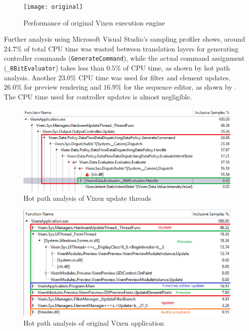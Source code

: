 \begin{figure}[t]
  \centering
  \texttt{[image: original]}
  \caption{Performance of original Vixen execution engine}
  \label{fig:original}
\end{figure}

Further analysis using Microsoft Visual Studio's sampling profiler shows, around $24.7 \%$ of total CPU time was wasted between translation layers for generating controller commands (\texttt{GenerateCommand}), while the actual command assignment (\texttt{\_8BitEvaluator}) takes less than $0.5 \%$ of CPU time, as shown by  hot path analysis. Another $23.0 \%$ CPU time was used for filter and element updates, $26.0 \%$ for preview rendering and $16.9 \%$ for the sequence editor, as shown by . The CPU time used for controller updates is almost negligible.

\begin{figure}[t]
  \centering
  \includegraphics[width=0.85\columnwidth]{Figs/vixen_perf_original.png}
  \caption{Hot path analysis of Vixen update threads}
  \label{fig:vixen_perf_original}
\end{figure}

\begin{figure}[t]
  \centering
  \includegraphics[width=0.85\columnwidth]{Figs/vixen_perf_original_overview.png}
  \caption{Hot path analysis of original Vixen application}
  \label{fig:vixen_perf_original_overview}
\end{figure}

